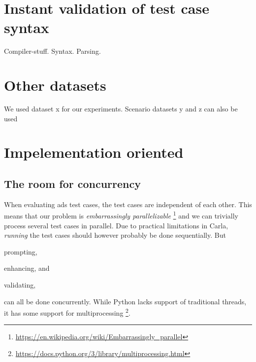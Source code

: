 \section{Instant validation of test case syntax}
Compiler-stuff. Syntax. Parsing.


\section{Other datasets}

We used dataset x for our experiments. Scenario datasets y and z can also be used

\section{Impelementation oriented}

\subsection{The room for concurrency}

When evaluating \acrshort{ads} test cases, the test cases are independent of each
other. This means that our problem is \textit{embarrassingly parallelizable}
\footnote{\url{https://en.wikipedia.org/wiki/Embarrassingly_parallel}} and we can
trivially process several test cases in parallel. Due to practical limitations
in Carla, \textit{running} the test cases should however probably be done
sequentially. But \begin{inparaenum}
    \item prompting,
    \item enhancing, and
    \item validating,
\end{inparaenum}
can all be done concurrently. While Python lacks support of traditional threads,
it has some support for multiprocessing
\footnote{\url{https://docs.python.org/3/library/multiprocessing.html}}.